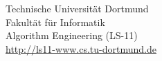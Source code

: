 \begin{titlepage}
\vspace*{2.5cm}
\hspace*{\links}
\begin{minipage}[b]{8cm}
\raggedright
\textcolor{TUGreen}{Technische Universität Dortmund} \\
\textcolor{TUGreen}{Fakultät für Informatik}\\
\textcolor{TUGreen}{Algorithm Engineering (LS-11)}\\
\href{http://ls11-www.cs.tu-dortmund.de}{http://ls11-www.cs.tu-dortmund.de}
\end{minipage}

\end{titlepage}
